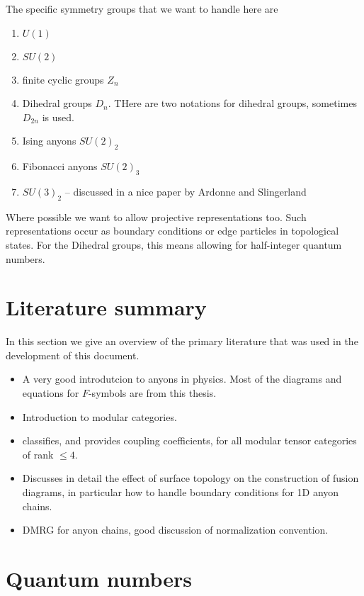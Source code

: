 \documentclass[12pt]{article}
\begin{document}
The specific symmetry groups that we want to handle here are
\begin{enumerate}
\item $U(1)$
\item $SU(2)$
\item finite cyclic groups $Z_n$
\item Dihedral groups $D_n$. THere are two notations for dihedral groups, sometimes $D_{2n}$ is used.
\item Ising anyons $SU(2)_2$
\item Fibonacci anyons $SU(2)_3$
\item $SU(3)_2$ -- discussed in a nice paper by Ardonne and Slingerland\cite{Ardonne}
\end{enumerate}
Where possible we want to allow projective representations too. Such representations occur
as boundary conditions or edge particles in topological states. For the Dihedral
groups, this means allowing for half-integer quantum numbers.

\section{Literature summary}

In this section we give an overview of the primary literature that was used in the development of this document.

\begin{itemize}
\item \cite{Bonderson} A very good introdutcion to anyons in physics. Most of the diagrams and equations for $F$-symbols
are from this thesis.
\item \cite{MTC} Introduction to modular categories.
\item \cite{MTCClassification} classifies, and provides coupling coefficients, for all
modular tensor categories of rank $\leq 4$.
\item \cite{Pfeifer} Discusses in detail the effect of surface topology on the construction of fusion diagrams, in
particular how to handle boundary conditions for 1D anyon chains.
\item \cite{AnyonDMRG} DMRG for anyon chains, good discussion of normalization convention.
\end{itemize}

\section{Quantum numbers}
\end{document}
